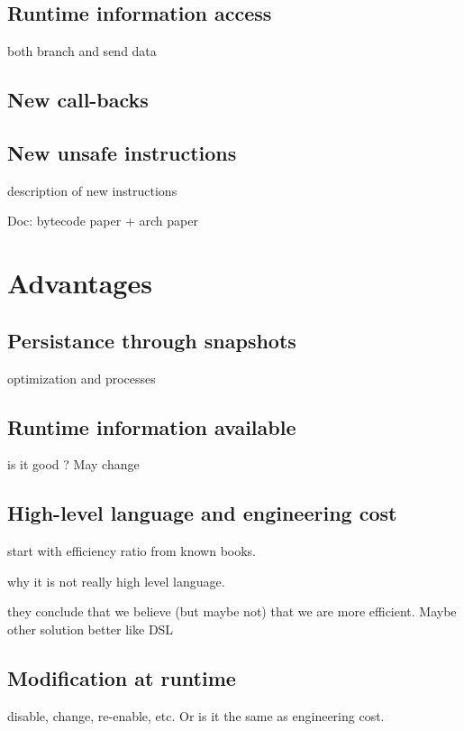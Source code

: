 \documentclass[a4paper,12pt,twoside]{../includes/ThesisStyle}
\begin{document}
\subsection{Runtime information access}

both branch and send data

\subsection{New call-backs}

\subsection{New unsafe instructions}

description of new instructions

Doc: bytecode paper + arch paper

\section{Advantages}

\subsection{Persistance through snapshots}

optimization and processes

\subsection{Runtime information available}

is it good ? May change

\subsection{High-level language and engineering cost}

start with efficiency ratio from known books.

why it is not really high level language.

they conclude that we believe (but maybe not) that we are more efficient. Maybe other solution better like DSL

\subsection{Modification at runtime}

disable, change, re-enable, etc.
Or is it the same as engineering cost.
\end{document}

